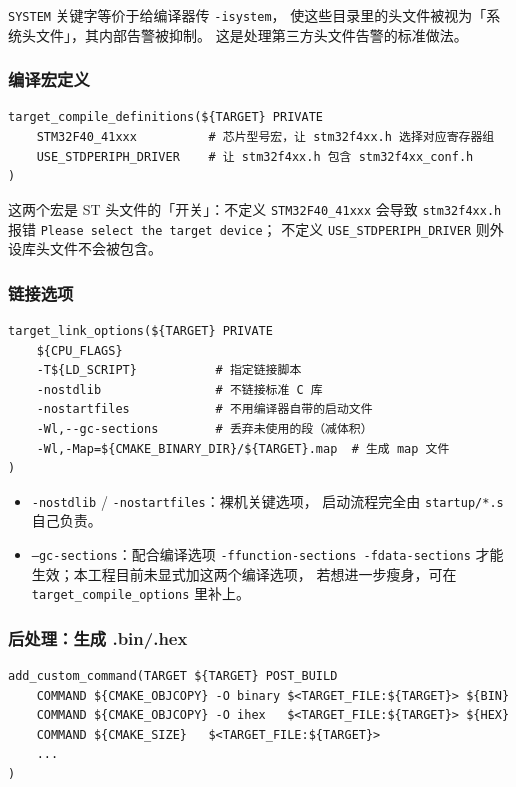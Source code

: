 \texttt{SYSTEM} 关键字等价于给编译器传 \texttt{-isystem}，
使这些目录里的头文件被视为「系统头文件」，其内部告警被抑制。
这是处理第三方头文件告警的标准做法。

\subsubsection{编译宏定义}

\begin{lstlisting}[style=generic]
target_compile_definitions(${TARGET} PRIVATE
    STM32F40_41xxx          # 芯片型号宏，让 stm32f4xx.h 选择对应寄存器组
    USE_STDPERIPH_DRIVER    # 让 stm32f4xx.h 包含 stm32f4xx_conf.h
)
\end{lstlisting}

这两个宏是 ST 头文件的「开关」：不定义 \texttt{STM32F40\_41xxx} 会导致
\texttt{stm32f4xx.h} 报错 \texttt{Please select the target device}；
不定义 \texttt{USE\_STDPERIPH\_DRIVER} 则外设库头文件不会被包含。

\subsubsection{链接选项}

\begin{lstlisting}[style=generic]
target_link_options(${TARGET} PRIVATE
    ${CPU_FLAGS}
    -T${LD_SCRIPT}           # 指定链接脚本
    -nostdlib                # 不链接标准 C 库
    -nostartfiles            # 不用编译器自带的启动文件
    -Wl,--gc-sections        # 丢弃未使用的段（减体积）
    -Wl,-Map=${CMAKE_BINARY_DIR}/${TARGET}.map  # 生成 map 文件
)
\end{lstlisting}

\begin{itemize}
  \item \texttt{-nostdlib} / \texttt{-nostartfiles}：裸机关键选项，
        启动流程完全由 \texttt{startup/*.s} 自己负责。
  \item \texttt{--gc-sections}：配合编译选项 \texttt{-ffunction-sections
        -fdata-sections} 才能生效；本工程目前未显式加这两个编译选项，
        若想进一步瘦身，可在 \texttt{target\_compile\_options} 里补上。
\end{itemize}

\subsubsection{后处理：生成 .bin/.hex}

\begin{lstlisting}[style=generic]
add_custom_command(TARGET ${TARGET} POST_BUILD
    COMMAND ${CMAKE_OBJCOPY} -O binary $<TARGET_FILE:${TARGET}> ${BIN}
    COMMAND ${CMAKE_OBJCOPY} -O ihex   $<TARGET_FILE:${TARGET}> ${HEX}
    COMMAND ${CMAKE_SIZE}   $<TARGET_FILE:${TARGET}>
    ...
)
\end{lstlisting}

